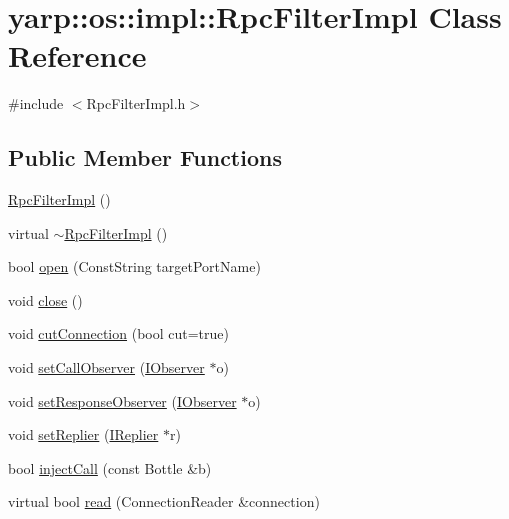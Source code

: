 \hypertarget{classyarp_1_1os_1_1impl_1_1_rpc_filter_impl}{
\section{yarp::os::impl::RpcFilterImpl Class Reference}
\label{classyarp_1_1os_1_1impl_1_1_rpc_filter_impl}
}


{\ttfamily \#include $<$RpcFilterImpl.h$>$}\subsection*{Public Member Functions}
\begin{DoxyCompactItemize}
\item 
\hyperlink{classyarp_1_1os_1_1impl_1_1_rpc_filter_impl_a15ed48bd9dfa1d97e242ea54b7d17977}{RpcFilterImpl} ()
\item 
virtual \hyperlink{classyarp_1_1os_1_1impl_1_1_rpc_filter_impl_af0b70bf356655fd2de7133532798faf0}{$\sim$RpcFilterImpl} ()
\item 
bool \hyperlink{classyarp_1_1os_1_1impl_1_1_rpc_filter_impl_a9ee7fb8756ba19285866308cdf1d60c2}{open} (ConstString targetPortName)
\item 
void \hyperlink{classyarp_1_1os_1_1impl_1_1_rpc_filter_impl_a6617044e3948a5fa890a68a918d93c72}{close} ()
\item 
void \hyperlink{classyarp_1_1os_1_1impl_1_1_rpc_filter_impl_a3c3f3382e223f75955459fc29bbd9e3d}{cutConnection} (bool cut=true)
\item 
void \hyperlink{classyarp_1_1os_1_1impl_1_1_rpc_filter_impl_aeca9c8a9d37355dd222a825bdb121c35}{setCallObserver} (\hyperlink{classyarp_1_1os_1_1_i_observer}{IObserver} $\ast$o)
\item 
void \hyperlink{classyarp_1_1os_1_1impl_1_1_rpc_filter_impl_af31c769d6b5e50170d080aea6aa650c5}{setResponseObserver} (\hyperlink{classyarp_1_1os_1_1_i_observer}{IObserver} $\ast$o)
\item 
void \hyperlink{classyarp_1_1os_1_1impl_1_1_rpc_filter_impl_aa7595e915624ac4c6126919c00761a23}{setReplier} (\hyperlink{classyarp_1_1os_1_1_i_replier}{IReplier} $\ast$r)
\item 
bool \hyperlink{classyarp_1_1os_1_1impl_1_1_rpc_filter_impl_a0f795cf3383a030884a7fde9843de1f7}{injectCall} (const Bottle \&b)
\item 
virtual bool \hyperlink{classyarp_1_1os_1_1impl_1_1_rpc_filter_impl_ab8ff43bc5f1f926aa49185818fdfe3b7}{read} (ConnectionReader \&connection)
\end{DoxyCompactItemize}



